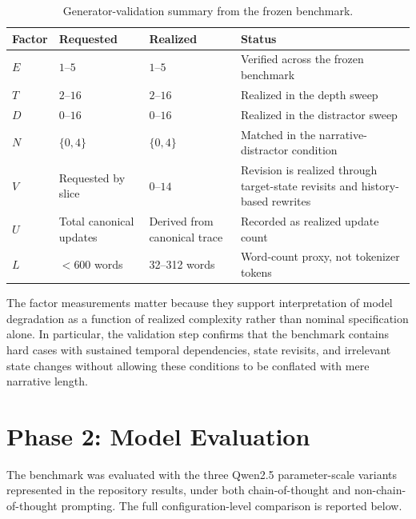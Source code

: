 \documentclass{iutbscthesis}
\begin{document}
\begin{table}[H]
\centering
\begin{tabular}{p{}p{}p{}p{}}
\toprule
\textbf{Factor} & \textbf{Requested} & \textbf{Realized} & \textbf{Status} \\
\midrule
$E$ & $1$--$5$ & $1$--$5$ & Verified across the frozen benchmark \\
$T$ & $2$--$16$ & $2$--$16$ & Realized in the depth sweep \\
$D$ & $0$--$16$ & $0$--$16$ & Realized in the distractor sweep \\
$N$ & $\{0,4\}$ & $\{0,4\}$ & Matched in the narrative-distractor condition \\
$V$ & Requested by slice & $0$--$14$ & Revision is realized through target-state revisits and history-based rewrites \\
$U$ & Total canonical updates & Derived from canonical trace & Recorded as realized update count \\
$L$ & $<600$ words & 32--312 words & Word-count proxy, not tokenizer tokens \\
\bottomrule
\end{tabular}
\caption{Generator-validation summary from the frozen benchmark.}
\label{tab:factor-validation}
\end{table}

The factor measurements matter because they support interpretation of model degradation as a function of
realized complexity rather than nominal specification alone. In particular, the validation step confirms
that the benchmark contains hard cases with sustained temporal dependencies, state revisits, and
irrelevant state changes without allowing these conditions to be conflated with mere narrative length.

\section{Phase 2: Model Evaluation}
The benchmark was evaluated with the three Qwen2.5 parameter-scale variants represented in the repository results, under
both chain-of-thought and non-chain-of-thought prompting. The full configuration-level comparison is
reported below.
\end{document}
